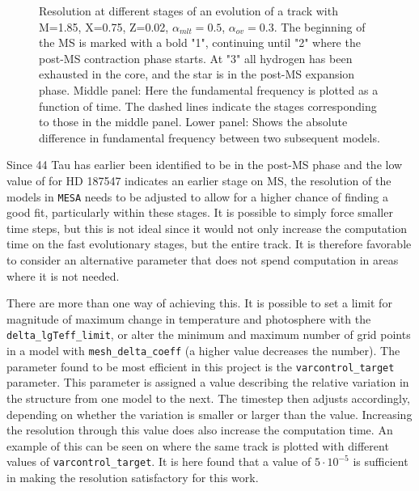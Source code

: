 \begin{figure}[htbp]
    \centering
    \caption{Resolution at different stages of an evolution of a track with M=1.85\msun, X=0.75, Z=0.02, $\alpha_{mlt} = 0.5$, $\alpha_{ov} = 0.3$. The beginning of the MS is marked with a bold "1", continuing until "2" where the post-MS contraction phase starts. At "3" all hydrogen has been exhausted in the core, and the star is in the post-MS expansion phase. Middle panel: Here the fundamental frequency is plotted as a function of time. The dashed lines indicate the stages corresponding to those in the middle panel. Lower panel: Shows the absolute difference in fundamental frequency between two subsequent models.}
    \label{resstage}
\end{figure}

Since 44 Tau has earlier been identified to be in the post-MS phase and the low value of \lum for HD 187547 indicates an earlier stage on MS, the resolution of the models in \texttt{MESA} needs to be adjusted to allow for a higher chance of finding a good fit, particularly within these stages. It is possible to simply force smaller time steps, but this is not ideal since it would not only increase the computation time on the fast evolutionary stages, but the entire track. It is therefore favorable to consider an alternative parameter that does not spend computation in areas where it is not needed. 

There are more than one way of achieving this. It is possible to set a limit for magnitude of maximum change in temperature and photosphere with the \texttt{delta\_lgTeff\_limit}, or alter the minimum and maximum number of grid points in a model with \texttt{mesh\_delta\_coeff} (a higher value decreases the number). The parameter found to be most efficient in this project is the \texttt{varcontrol\_target} parameter. This parameter is assigned a value describing the relative variation in the structure from one model to the next. The timestep then adjusts accordingly, depending on whether the variation is smaller or larger than the value. Increasing the resolution through this value does also increase the computation time. An example of this can be seen on  where the same track is plotted with different values of \texttt{varcontrol\_target}. It is here found that a value of $5\cdot10^{-5}$ is sufficient in making the resolution satisfactory for this work. 

